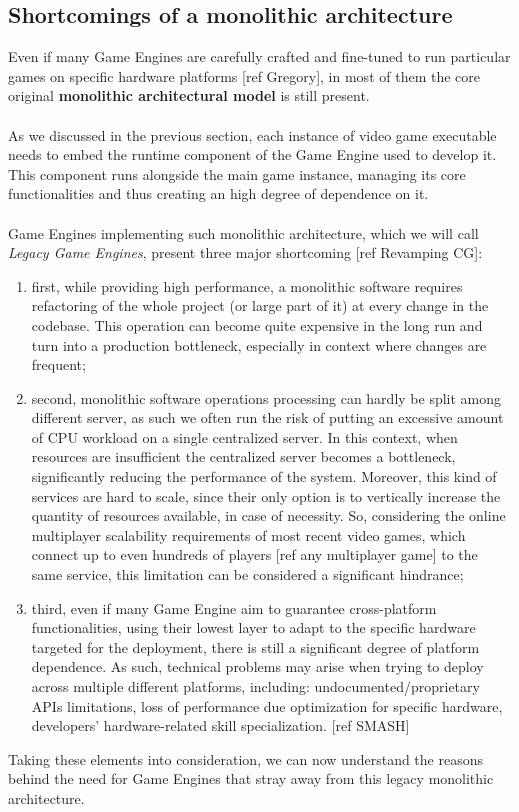 \subsection{Shortcomings of a monolithic architecture}
Even if many Game Engines are carefully crafted and fine-tuned to run particular games on specific hardware platforms [ref Gregory], in most of them the core original \textbf{monolithic architectural model} is still present. \\ \\
As we discussed in the previous section, each instance of video game executable needs to embed the runtime component of the Game Engine used to develop it. This component runs alongside the main game instance, managing its core functionalities and thus creating an high degree of dependence on it. \\ \\
Game Engines implementing such monolithic architecture, which we will call \textit{Legacy Game Engines}, present three major shortcoming [ref Revamping CG]:
\begin{enumerate}
	\item first, while providing high performance, a monolithic software requires refactoring of the whole project (or large part of it) at every change in the codebase. This operation can become quite expensive in the long run and turn into a production bottleneck, especially in context where changes are frequent;
	\item second, monolithic software operations processing can hardly be split among different server, as such we often run the risk of putting an excessive amount of CPU workload on a single centralized server. In this context, when resources are insufficient the centralized server becomes a bottleneck, significantly reducing the performance of the system. Moreover, this kind of services are hard to scale, since their only option is to vertically increase the quantity of resources available, in case of necessity. So, considering the online multiplayer scalability requirements of most recent video games, which connect up to even hundreds of players [ref any multiplayer game] to the same service, this limitation can be considered a significant hindrance;
	\item third, even if many Game Engine aim to guarantee cross-platform functionalities, using their lowest layer to adapt to the specific hardware targeted for the deployment, there is still a significant degree of platform dependence. As such, technical problems may arise when trying to deploy across multiple different platforms, including: undocumented/proprietary APIs limitations, loss of performance due optimization for specific hardware, developers' hardware-related skill specialization. [ref SMASH]
\end{enumerate}
Taking these elements into consideration, we can now understand the reasons behind the need for Game Engines that stray away from this legacy monolithic architecture.

